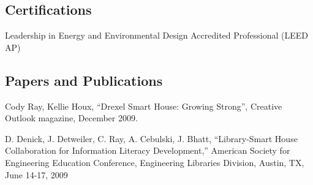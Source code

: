 \documentclass[margin]{res}
\begin{document}
\begin{resume}

\begin{educate}
\section{Certifications}
Leadership in Energy and Environmental Design Accredited Professional (LEED AP)
\end{educate}

\begin{educate}
\section{Papers and Publications}
\begin{list}{}{\leftmargin=1em} \itemsep -2pt %
\item Cody Ray, Kellie Houx, ``Drexel Smart House: Growing Strong'', Creative Outlook magazine, December 2009.
\item D. Denick, J. Detweiler, C. Ray, A. Cebulski, J. Bhatt, ``Library-Smart House Collaboration for Information Literacy Development,'' American Society for Engineering Education Conference, Engineering Libraries Division, Austin, TX, June 14-17, 2009
\end{list}
\end{educate}


\end{resume}
\end{document}
